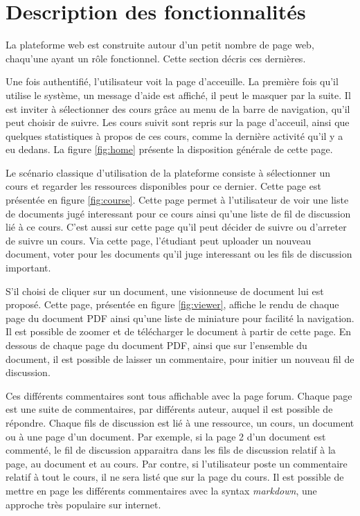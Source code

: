 \documentclass[a4paper,12pt]{article}
\begin{document}
\section{Description des fonctionnalités}

La plateforme web est construite autour d'un petit nombre de page web, chaqu'une
ayant un rôle fonctionnel. Cette section décris ces dernières.

Une fois authentifié, l'utilisateur voit la page d'acceuille. La première fois qu'il
utilise le système, un message d'aide est affiché, il peut le masquer par la suite.
Il est inviter à sélectionner des cours grâce au menu de la barre de navigation,
qu'il peut choisir de suivre. Les cours suivit sont repris sur la page d'acceuil, ainsi
que quelques statistiques à propos de ces cours, comme la dernière activité qu'il y
a eu dedans. La figure \ref{fig:home} présente la disposition générale de cette page.

Le scénario classique d'utilisation de la plateforme consiste à sélectionner un cours
et regarder les ressources disponibles pour ce dernier. Cette page est présentée en
figure \ref{fig:course}. Cette page permet à l'utilisateur de voir une liste de documents
jugé interessant pour ce cours ainsi qu'une liste de fil de discussion lié à ce cours.
C'est aussi sur cette page qu'il peut décider de suivre ou d'arreter de suivre un cours.
Via cette page, l'étudiant peut uploader un nouveau document, voter pour les documents
qu'il juge interessant ou les fils de discussion important.

S'il choisi de cliquer sur un document, une visionneuse de document lui est proposé.
Cette page, présentée en figure \ref{fig:viewer}, affiche le rendu de chaque page
du document PDF ainsi qu'une liste de miniature pour facilité la navigation. Il
est possible de zoomer et de télécharger le document à partir de cette page. En
dessous de chaque page du document PDF, ainsi que sur l'ensemble du document, il
est possible de laisser un commentaire, pour initier un nouveau fil de discussion.

Ces différents commentaires sont tous affichable avec la page forum. Chaque page
est une suite de commentaires, par différents auteur, auquel il est possible
de répondre. Chaque fils de discussion est lié à une ressource, un cours, un
document ou à une page d'un document. Par exemple, si la page 2 d'un document
est commenté, le fil de discussion apparaitra dans les fils de discussion
relatif à la page, au document et au cours. Par contre, si l'utilisateur
poste un commentaire relatif à tout le cours, il ne sera listé que sur la page
du cours. Il est possible de mettre en page les différents commentaires avec la syntax
\textit{markdown}, une approche très populaire sur internet.
\end{document}
